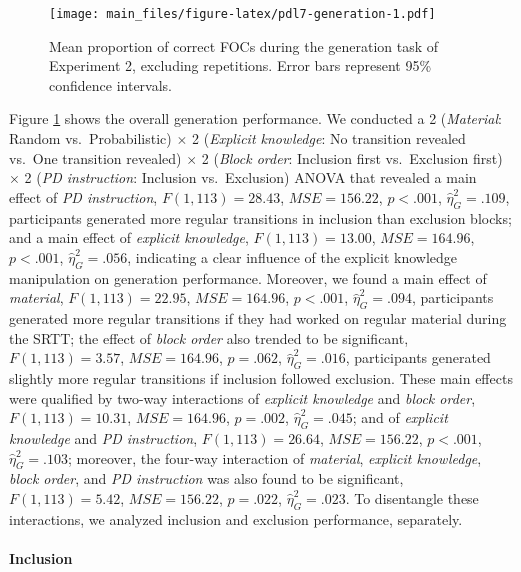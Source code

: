 \documentclass[man]{apa6}
\theoremstyle{definition}
\theoremstyle{definition}
\theoremstyle{definition}
\theoremstyle{remark}
\begin{document}
\begin{appendix}
\begin{figure}
\centering
\texttt{[image: main\_files/figure-latex/pdl7-generation-1.pdf]}
\caption{\label{fig:pdl7-generation}Mean proportion of correct FOCs during
the generation task of Experiment 2, excluding repetitions. Error bars
represent 95\% confidence intervals.}
\end{figure}

Figure \ref{fig:pdl7-generation} shows the overall generation
performance. We conducted a 2 (\emph{Material}: Random
vs.~Probabilistic) \(\times\) 2 (\emph{Explicit knowledge}: No
transition revealed vs.~One transition revealed) \(\times\) 2
(\emph{Block order}: Inclusion first vs.~Exclusion first) \(\times\) 2
(\emph{PD instruction}: Inclusion vs.~Exclusion) ANOVA that revealed a
main effect of \emph{PD instruction}, \(F(1, 113) = 28.43\),
\(\mathit{MSE} = 156.22\), \(p < .001\), \(\hat{\eta}^2_G = .109\),
participants generated more regular transitions in inclusion than
exclusion blocks; and a main effect of \emph{explicit knowledge},
\(F(1, 113) = 13.00\), \(\mathit{MSE} = 164.96\), \(p < .001\),
\(\hat{\eta}^2_G = .056\), indicating a clear influence of the explicit
knowledge manipulation on generation performance. Moreover, we found a
main effect of \emph{material}, \(F(1, 113) = 22.95\),
\(\mathit{MSE} = 164.96\), \(p < .001\), \(\hat{\eta}^2_G = .094\),
participants generated more regular transitions if they had worked on
regular material during the SRTT; the effect of \emph{block order} also
trended to be significant, \(F(1, 113) = 3.57\),
\(\mathit{MSE} = 164.96\), \(p = .062\), \(\hat{\eta}^2_G = .016\),
participants generated slightly more regular transitions if inclusion
followed exclusion. These main effects were qualified by two-way
interactions of \emph{explicit knowledge} and \emph{block order},
\(F(1, 113) = 10.31\), \(\mathit{MSE} = 164.96\), \(p = .002\),
\(\hat{\eta}^2_G = .045\); and of \emph{explicit knowledge} and \emph{PD
instruction}, \(F(1, 113) = 26.64\), \(\mathit{MSE} = 156.22\),
\(p < .001\), \(\hat{\eta}^2_G = .103\); moreover, the four-way
interaction of \emph{material}, \emph{explicit knowledge}, \emph{block
order}, and \emph{PD instruction} was also found to be significant,
\(F(1, 113) = 5.42\), \(\mathit{MSE} = 156.22\), \(p = .022\),
\(\hat{\eta}^2_G = .023\). To disentangle these interactions, we
analyzed inclusion and exclusion performance, separately.

\paragraph{Inclusion}\label{inclusion}


\end{appendix}
\end{document}
